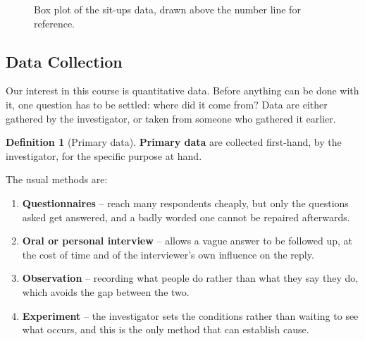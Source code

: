 \documentclass[11pt,a4paper]{article}
\theoremstyle{definition}
\newtheorem{definition}[thm]{Definition}
\begin{document}
\begin{figure}[H]
\centering
{}
\caption{Box plot of the sit-ups data, drawn above the number line for reference.}
\end{figure}









\vspace{0.7cm}




\subsection{Data Collection}
Our interest in this course is quantitative data. Before anything can be done with it, one
question has to be settled: where did it come from? Data are either gathered by the
investigator, or taken from someone who gathered it earlier.

\begin{definition}[Primary data]
\textbf{Primary data} are collected first-hand, by the investigator, for the specific
purpose at hand.
\end{definition}

The usual methods are:
\begin{enumerate}
\item \textbf{Questionnaires} -- reach many respondents cheaply, but only the questions
asked get answered, and a badly worded one cannot be repaired afterwards.
\item \textbf{Oral or personal interview} -- allows a vague answer to be followed up, at
the cost of time and of the interviewer's own influence on the reply.
\item \textbf{Observation} -- recording what people do rather than what they say they do,
which avoids the gap between the two.
\item \textbf{Experiment} -- the investigator sets the conditions rather than waiting to
see what occurs, and this is the only method that can establish cause.
\end{enumerate}
\end{document}
